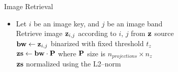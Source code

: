 \begin{frame}{Image Retrieval}
    \begin{itemize}
        \item[\xspace]
            \begin{algorithm}[H]
                \SetAlgoLined
                     {
                        Let $i$ be an image key, and $j$ be an image band \\
                        Retrieve image $\boldsymbol{\mathbf{z}}_{i,j}$ according to $i$, $j$ from $\boldsymbol{\mathbf{z}}$ source \\
                        $\boldsymbol{\mathbf{bw}} \gets \boldsymbol{\mathbf{z}}_{i,j}$ binarized with fixed threshold $t_z$ \\
                        $\boldsymbol{\mathbf{zs}} \gets \boldsymbol{\mathbf{bw}} \cdot \boldsymbol{\mathbf{P}}$ where $\boldsymbol{\mathbf{P}}$ size is $n_{projections} \times n_z$ \\
                        \Return $\boldsymbol{\mathbf{zs}}$ normalized using the L2--norm
                    }
                \caption{Pseudo--code to retrieve a vector given an \newline
                image key $i$, an image band $j$, and the desired number \newline 
                of projections to use for dimensionality reduction.}
                \label{pscode:retrieve-vector}
            \end{algorithm}
    \end{itemize}
\end{frame}